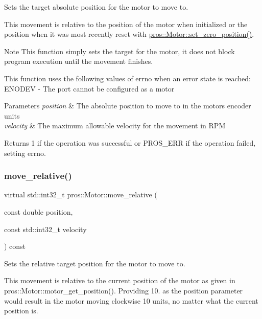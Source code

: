 Sets the target absolute position for the motor to move to.

This movement is relative to the position of the motor when initialized or the position when it was most recently reset with \hyperlink{classpros_1_1Motor_af20c036c1d5d68eb5e762c12f9a4b7fe}{pros\+::\+Motor\+::set\+\_\+zero\+\_\+position()}.

\begin{DoxyNote}{Note}
This function simply sets the target for the motor, it does not block program execution until the movement finishes.
\end{DoxyNote}
This function uses the following values of errno when an error state is reached\+: E\+N\+O\+D\+EV -\/ The port cannot be configured as a motor


\begin{DoxyParams}{Parameters}
{\em position} & The absolute position to move to in the motor\textquotesingle{}s encoder units \\
\hline
{\em velocity} & The maximum allowable velocity for the movement in R\+PM\\
\hline
\end{DoxyParams}
\begin{DoxyReturn}{Returns}
1 if the operation was successful or P\+R\+O\+S\+\_\+\+E\+RR if the operation failed, setting errno. 
\end{DoxyReturn}
\mbox{\label{classpros_1_1Motor_a96c09e169b5135d9001cec92fa2686c1}} 
\subsubsection{\texorpdfstring{move\+\_\+relative()}{move\_relative()}}
{\footnotesize\ttfamily virtual std\+::int32\+\_\+t pros\+::\+Motor\+::move\+\_\+relative (\begin{DoxyParamCaption}\item[{const double}]{position,  }\item[{const std\+::int32\+\_\+t}]{velocity }\end{DoxyParamCaption}) const\hspace{0.3cm}{\ttfamily [virtual]}}

Sets the relative target position for the motor to move to.

This movement is relative to the current position of the motor as given in pros\+::\+Motor\+::motor\+\_\+get\+\_\+position(). Providing 10. as the position parameter would result in the motor moving clockwise 10 units, no matter what the current position is.

